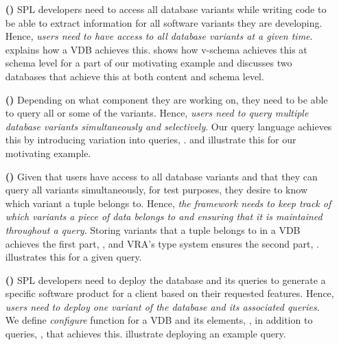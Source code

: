 \begin{enumerate}[wide, labelwidth=!, labelindent=0pt, topsep=1pt]
\itemsep0em
\item [\textbf{(\nZero)}]
SPL developers need to access all database variants while
writing code to be able to extract information for all software variants
they are developing. 
%
Hence,
\emph{users need to have access to all database variants at a given time}.
%
 explains how a VDB achieves this.
 shows how v-schema achieves
this at schema level for a part of our motivating example 
and  discusses two databases
that achieve this at both content and schema level.
%
\item [\textbf{(\nOne)}]
Depending on what component they are working on,
they need to be able to query all or some of the variants.
%
Hence, 
\emph{users need to query multiple database variants simultaneously and selectively}.
%
Our query language achieves this by introducing variation into queries, .
 and  illustrate this 
for our motivating example.
%
\item [\textbf{(\nTwo)}]
Given that users have access to all database variants and that they
can query all variants simultaneously, for test purposes, 
they desire to know which variant a tuple belongs to.
%
Hence,
\emph{the framework needs to 
keep track of which variants a piece of data belongs to and ensuring that 
it is maintained throughout a query}.
%
Storing variants that a tuple belongs to in a VDB achieves the first part, , and
VRA's type system ensures the second part, .
 illustrates this for a given query.
%
\item [\textbf{(\nThree)}]
SPL developers need to deploy the database and its queries
to generate a specific software product for a client based on their
requested features. 
%
Hence,
\emph{users need to deploy one variant of the database and its associated queries}.
%
We define \emph{configure} function for a VDB and its elements, , 
in addition to queries, , that achieves this. 
 illustrate deploying an example query.
%
\end{enumerate}


